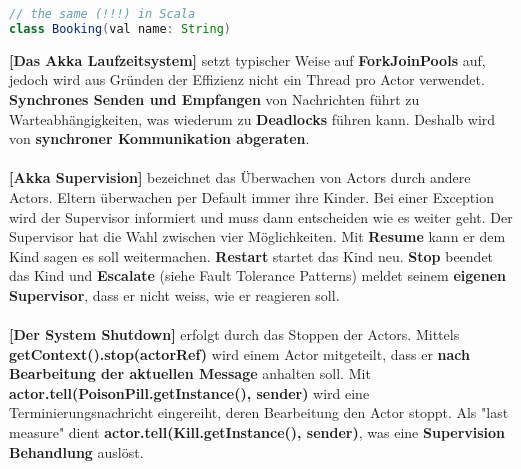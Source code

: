 \documentclass[8pt]{extarticle}
\let\oldtextbf\textbf
\renewcommand{\textbf}{\tiny\oldtextbf}
\begin{document}
\begin{multicols*}{5}
\begin{lstlisting}[language=java]
// the same (!!!) in Scala
class Booking(val name: String)
\end{lstlisting}
\textbf{[Das Akka Laufzeitsystem]} setzt typischer Weise auf \textbf{ForkJoinPools} auf, jedoch wird aus Gründen der Effizienz nicht ein Thread pro Actor verwendet. \textbf{Synchrones Senden und Empfangen} von Nachrichten führt zu Warteabhängigkeiten, was wiederum zu \textbf{Deadlocks} führen kann. Deshalb wird von \textbf{synchroner Kommunikation abgeraten}.\\\\
\textbf{[Akka Supervision]} bezeichnet das Überwachen von Actors durch andere Actors. Eltern überwachen per Default immer ihre Kinder. Bei einer Exception wird der Supervisor informiert und muss dann entscheiden wie es weiter geht. Der Supervisor hat die Wahl zwischen vier Möglichkeiten. Mit \textbf{Resume} kann er dem Kind sagen es soll weitermachen. \textbf{Restart} startet das Kind neu. \textbf{Stop} beendet das Kind und \textbf{Escalate} (siehe Fault Tolerance Patterns) meldet seinem \textbf{eigenen Supervisor}, dass er nicht weiss, wie er reagieren soll.\\\\
\textbf{[Der System Shutdown]} erfolgt durch das Stoppen der Actors. Mittels \textbf{getContext().stop(actorRef)} wird einem Actor mitgeteilt, dass er \textbf{nach Bearbeitung der aktuellen Message} anhalten soll. Mit \textbf{actor.tell(PoisonPill.getInstance(), sender)} wird eine Terminierungsnachricht eingereiht, deren Bearbeitung den Actor stoppt. Als "last measure" dient \textbf{actor.tell(Kill.getInstance(), sender)}, was eine \textbf{Supervision Behandlung} auslöst.
\end{multicols*}
\end{document}

